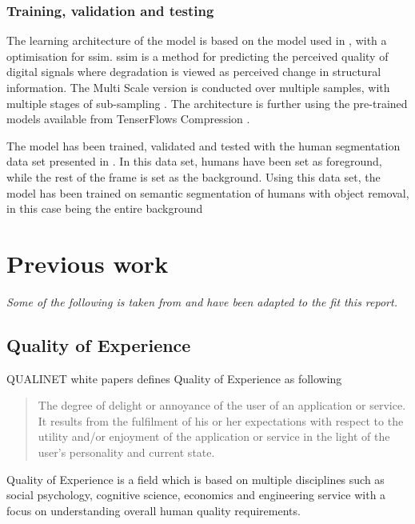 \subsubsection{Training, validation and testing}\label{sec:training}
The learning architecture of the model is based on the model used in \cite{bmshj2018}, with a optimisation for \acrfull{ssim}. \acrshort{ssim} is a method for predicting the perceived quality of digital signals where degradation is viewed as perceived change in structural information. The Multi Scale version is conducted over multiple samples, with multiple stages of sub-sampling \cite{mssssim}. The architecture is further using the pre-trained models available from TenserFlows Compression \cite{tensorflow_compression}.

The model has been trained, validated and tested with the human segmentation data set presented in \cite{gmnu21}. In this data set, humans have been set as foreground, while the rest of the frame is set as the background. Using this data set, the model has been trained on semantic segmentation of humans with object removal, in this case being the entire background


\section{Previous work}\label{sec:previous}

\textit{Some of the following is taken from \cite{prp} and have been adapted to the fit this report.}
\subsection{Quality of Experience}
\label{sec:qoe}
QUALINET white papers defines Quality of Experience as following \cite{book_QoE}

\begin{quote}
The degree of delight or annoyance of the user of an application or service. It results from the fulfilment of his or her expectations with respect to the utility and/or enjoyment of the application or service in the light of the user’s personality and current state.
\end{quote}

Quality of Experience is a field which is based on multiple disciplines such as social psychology, cognitive science, economics and engineering service with a focus on understanding overall human quality requirements.

